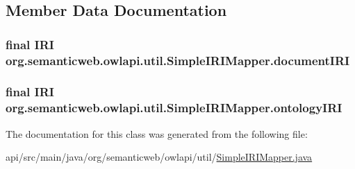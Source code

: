\subsection{Member Data Documentation}
\hypertarget{classorg_1_1semanticweb_1_1owlapi_1_1util_1_1_simple_i_r_i_mapper_af7e969ae573d1d704e849d65d5096dae}{
\subsubsection[{document\-I\-R\-I}]{\setlength{\rightskip}{0pt plus 5cm}final {\bf I\-R\-I} org.\-semanticweb.\-owlapi.\-util.\-Simple\-I\-R\-I\-Mapper.\-document\-I\-R\-I\hspace{0.3cm}{\ttfamily [private]}}}\label{classorg_1_1semanticweb_1_1owlapi_1_1util_1_1_simple_i_r_i_mapper_af7e969ae573d1d704e849d65d5096dae}
\hypertarget{classorg_1_1semanticweb_1_1owlapi_1_1util_1_1_simple_i_r_i_mapper_acd9fe8b7322f4627f0d418fcc124404c}{
\subsubsection[{ontology\-I\-R\-I}]{\setlength{\rightskip}{0pt plus 5cm}final {\bf I\-R\-I} org.\-semanticweb.\-owlapi.\-util.\-Simple\-I\-R\-I\-Mapper.\-ontology\-I\-R\-I\hspace{0.3cm}{\ttfamily [private]}}}\label{classorg_1_1semanticweb_1_1owlapi_1_1util_1_1_simple_i_r_i_mapper_acd9fe8b7322f4627f0d418fcc124404c}


The documentation for this class was generated from the following file\-:\begin{DoxyCompactItemize}
\item 
api/src/main/java/org/semanticweb/owlapi/util/\hyperlink{_simple_i_r_i_mapper_8java}{Simple\-I\-R\-I\-Mapper.\-java}\end{DoxyCompactItemize}
